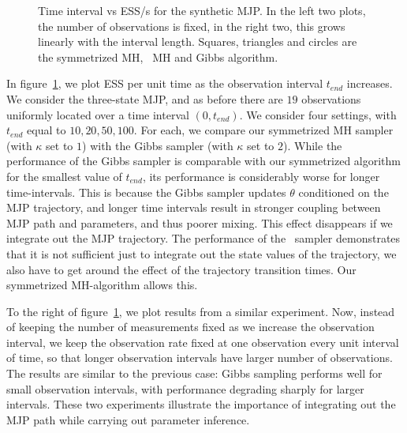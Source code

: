 \begin{figure}
\begin{minipage}[hp]{0.24\linewidth}
  \end{minipage}
  \caption{Time interval vs ESS/s for the synthetic MJP. In the left two plots, the number of observations is fixed, in the right two, this grows linearly with the interval length. Squares, triangles and circles are the symmetrized MH, \naive\ MH and Gibbs algorithm.
  }
     \label{fig:TSS}
  \end{figure}
In figure~\ref{fig:TSS}, we plot ESS per unit time as the observation interval $t_{end}$ increases. 
We consider the three-state MJP, and as before there are $19$ observations uniformly located over a time interval $(0,t_{end})$.
We consider four settings, with $t_{end}$ equal to $10, 20, 50, 100$. 
For each, we compare our symmetrized MH sampler (with $\kappa$ set to $1$) with the Gibbs sampler (with $\kappa$ set to $2$). 
While the performance of the Gibbs sampler is comparable with our symmetrized algorithm for the smallest value of $t_{end}$, its performance is considerably worse for longer time-intervals.  
This is because the Gibbs sampler updates $\theta$ conditioned on the MJP trajectory, and longer time intervals result in stronger coupling between MJP path and parameters, and thus poorer mixing. 
This effect disappears if we integrate out the MJP trajectory. 
The performance of the \naive\ sampler demonstrates that it is not sufficient just to integrate out the state values of the trajectory, we also have to get around the effect of the trajectory transition times. 
Our symmetrized MH-algorithm allows this. 


To the right of figure~\ref{fig:TSS}, we plot results from a similar experiment. 
Now, instead of keeping the number of measurements fixed as we increase the observation interval, we keep the observation rate fixed at one observation every unit interval of time, so that longer observation intervals have larger number of observations. 
The results are similar to the previous case: Gibbs sampling performs well for small observation intervals, with performance degrading sharply for larger intervals. 
These two experiments illustrate the importance of integrating out the MJP path while carrying out parameter inference.

